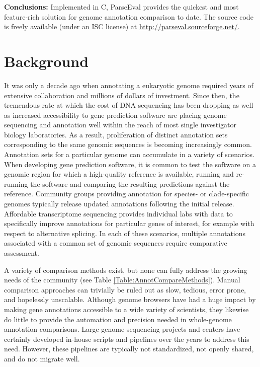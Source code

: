 \noindent \textbf{Conclusions:} Implemented in C, ParseEval provides the quickest and most feature-rich solution for genome annotation comparison
to date.
The source code is freely available (under an ISC license) at \url{http://parseval.sourceforge.net/}.

\section{Background}
It was only a decade ago when annotating a eukaryotic genome required years of extensive collaboration and millions of dollars of investment.
Since then, the tremendous rate at which the cost of DNA sequencing has been dropping as well as increased accessibility to gene prediction software are placing genome sequencing and annotation well within the reach of most single investigator biology laboratories.
As a result, proliferation of distinct annotation sets corresponding to the same genomic sequences is becoming increasingly common.
Annotation sets for a particular genome can accumulate in a variety of scenarios.
When developing gene prediction software, it is common to test the software on a genomic region for which a high-quality reference is available, running and re-running the software and comparing the resulting predictions against the reference.
Community groups providing annotation for species- or clade-specific genomes typically release updated annotations following the initial release.
Affordable transcriptome sequencing provides individual labs with data to specifically improve annotations for particular genes of interest, for example with respect to alternative splicing.
In each of these scenarios, multiple annotations associated with a common set of genomic sequences require comparative assessment.

A variety of comparison methods exist, but none can fully address the growing needs of the community (see Table \ref{Table:AnnotCompareMethods}).
Manual comparison approaches can trivially be ruled out as slow, tedious, error prone, and hopelessly unscalable.
Although genome browsers have had a huge impact by making gene annotations accessible to a wide variety of scientists, they likewise do little to provide the automation and precision needed in whole-genome annotation comparisons.
Large genome sequencing projects and centers have certainly developed in-house scripts and pipelines over the years to address this need.
However, these pipelines are typically not standardized, not openly shared, and do not migrate well.

